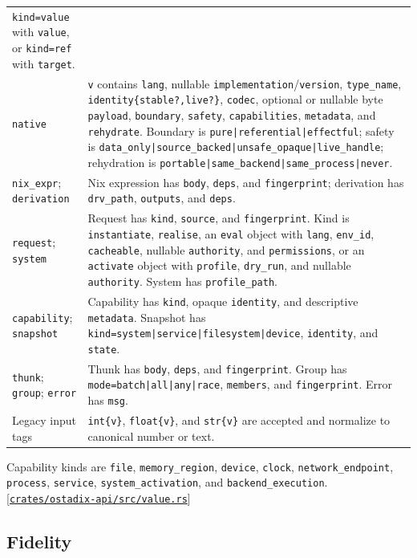 \documentclass[11pt,oneside]{article}
\newcommand{\src}[1]{\textcolor{OSlate}{\scriptsize[\href{https://github.com/lostadi/OSTADIX/blob/c0b02c326b2329a95ba52447c7180bc93957cd57/#1}{\nolinkurl{#1}}]}\allowbreak}
\begin{document}
\begin{longtable}{P{0.22\textwidth} P{0.70\textwidth}}
\texttt{kind=value} with \texttt{value}, or \texttt{kind=ref} with
\texttt{target}. \\
\texttt{native} & \texttt{v} contains \texttt{lang}, nullable
\texttt{implementation}/\texttt{version}, \texttt{type\_name},
\texttt{identity\{stable?,live?\}}, \texttt{codec}, optional or nullable byte
\texttt{payload}, \texttt{boundary}, \texttt{safety},
\texttt{capabilities}, \texttt{metadata}, and \texttt{rehydrate}. Boundary is
\texttt{pure|referential|effectful}; safety is
\texttt{data\_only|source\_backed|unsafe\_opaque|live\_handle}; rehydration is
\texttt{portable|same\_backend|same\_process|never}. \\
\texttt{nix\_expr}; \texttt{derivation} & Nix expression has \texttt{body},
\texttt{deps}, and \texttt{fingerprint}; derivation has \texttt{drv\_path},
\texttt{outputs}, and \texttt{deps}. \\
\texttt{request}; \texttt{system} & Request has \texttt{kind},
\texttt{source}, and \texttt{fingerprint}. Kind is \texttt{instantiate},
\texttt{realise}, an \texttt{eval} object with \texttt{lang},
\texttt{env\_id}, \texttt{cacheable}, nullable \texttt{authority}, and
\texttt{permissions}, or an \texttt{activate} object with \texttt{profile},
\texttt{dry\_run}, and nullable \texttt{authority}. System has
\texttt{profile\_path}. \\
\texttt{capability}; \texttt{snapshot} & Capability has \texttt{kind}, opaque
\texttt{identity}, and descriptive \texttt{metadata}. Snapshot has
\texttt{kind=system|service|filesystem|device}, \texttt{identity}, and
\texttt{state}. \\
\texttt{thunk}; \texttt{group}; \texttt{error} & Thunk has \texttt{body},
\texttt{deps}, and \texttt{fingerprint}. Group has
\texttt{mode=batch|all|any|race}, \texttt{members}, and \texttt{fingerprint}.
Error has \texttt{msg}. \\
Legacy input tags & \texttt{int\{v\}}, \texttt{float\{v\}}, and
\texttt{str\{v\}} are accepted and normalize to canonical number or text. \\
\bottomrule
\end{longtable}

Capability kinds are \texttt{file}, \texttt{memory\_region}, \texttt{device},
\texttt{clock}, \texttt{network\_endpoint}, \texttt{process},
\texttt{service}, \texttt{system\_activation}, and
\texttt{backend\_execution}. \src{crates/ostadix-api/src/value.rs}

\subsection{Fidelity}
\end{document}
